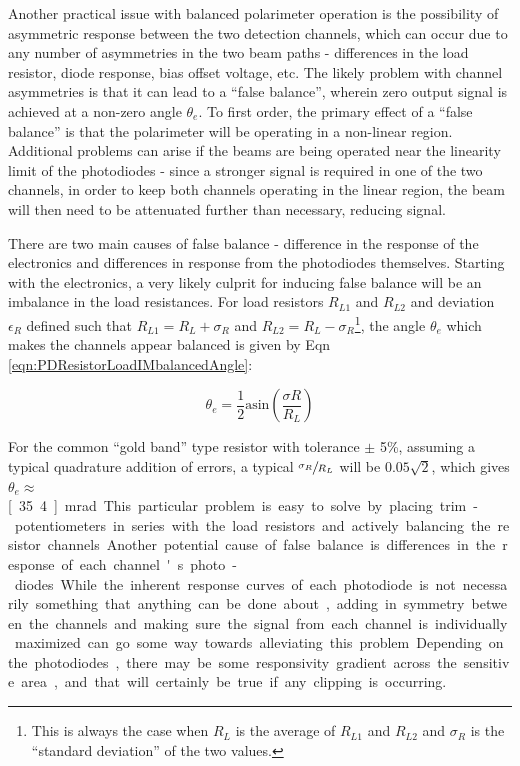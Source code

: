 \documentclass[PaulGanssle-Thesis.tex]{subfiles}
\begin{document}
Another practical issue with balanced polarimeter operation is the possibility of asymmetric response between the two detection channels, which can occur due to any number of asymmetries in the two beam paths - differences in the load resistor, diode response, bias offset voltage, etc. The likely problem with channel asymmetries is that it can lead to a ``false balance'', wherein zero output signal is achieved at a non-zero angle $\theta_{e}$. To first order, the primary effect of a ``false balance'' is that the polarimeter will be operating in a non-linear region. Additional problems can arise if the beams are being operated near the linearity limit of the photodiodes - since a stronger signal is required in one of the two channels, in order to keep both channels operating in the linear region, the beam will then need to be attenuated further than necessary, reducing signal.

There are two main causes of false balance - difference in the response of the electronics and differences in response from the photodiodes themselves. Starting with the electronics, a very likely culprit for inducing false balance will be an imbalance in the load resistances. For load resistors $R_{L1}$ and $R_{L2}$ and deviation $\epsilon_{R}$ defined such that $R_{L1} = R_{L} + \sigma_{R}$ and $R_{L2} = R_{L} - \sigma_{R}$\footnote{This is always the case when $R_{L}$ is the average of $R_{L1}$ and $R_{L2}$ and $\sigma_{R}$ is the ``standard deviation'' of the two values.}, the angle $\theta_{e}$ which makes the channels appear balanced is given by Eqn \ref{eqn:PDResistorLoadIMbalancedAngle}:

\begin{equation}
\label{eqn:PDResistorLoadIMbalancedAngle}
\theta_{e} = \frac{1}{2}\textrm{asin}\left(\frac{\sigma{R}}{R_{L}}\right)
\end{equation}

For the common ``gold band'' type resistor with tolerance $\pm$ 5\%, assuming a typical quadrature addition of errors, a typical $\sfrac{\sigma_{R}}{R_{L}}$ will be $0.05\sqrt{2}$, which gives $\theta_{e} \approx$ \unit[35.4]{mrad}. This particular problem is easy to solve by placing trim-potentiometers in series with the load resistors and actively balancing the resistor channels.

Another potential cause of false balance is differences in the response of each channel's photo-diodes. While the inherent response curves of each photodiode is not necessarily something that anything can be done about, adding in symmetry between the channels and making sure the signal from each channel is individually maximized can go some way towards alleviating this problem. Depending on the photodiodes, there may be some responsivity gradient across the sensitive area, and that will certainly be true if any clipping is occurring. 
\end{document}

